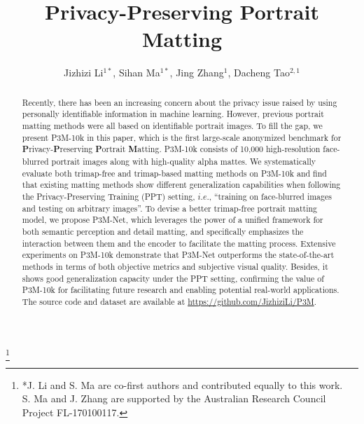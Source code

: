 \documentclass[sigconf]{acmart}
\begin{document}


\title{Privacy-Preserving Portrait Matting}

\author{Jizhizi Li$^{1*}$, Sihan Ma$^{1*}$, Jing Zhang$^{1}$, Dacheng Tao$^{2,1}$}
\thanks{*J. Li and S. Ma are co-first authors and contributed equally to this work.\\S. Ma and J. Zhang are supported by the Australian Research Council Project FL-170100117.}



\renewcommand{\shortauthors}{Li and Ma, et al.}

\setlength{\abovecaptionskip}{1pt}
\setlength{\belowcaptionskip}{1pt}
\setlength{\intextsep}{1pt}
\setlength{\textfloatsep}{2pt}

\begin{abstract}
Recently, there has been an increasing concern about the privacy issue raised by using personally identifiable information in machine learning. However, previous portrait matting methods were all based on identifiable portrait images. To fill the gap, we present P3M-10k in this paper, which is the first large-scale anonymized benchmark for \textbf{P}rivacy-\textbf{P}reserving \textbf{P}ortrait \textbf{M}atting. P3M-10k consists of 10,000 high-resolution face-blurred portrait images along with high-quality alpha mattes. We systematically evaluate both trimap-free and trimap-based matting methods on P3M-10k and find that existing matting methods show different generalization capabilities when following the Privacy-Preserving Training (PPT) setting, $i.e.$, ``training on face-blurred images and testing on arbitrary images''. To devise a better trimap-free portrait matting model, we propose P3M-Net, which leverages the power of a unified framework for both semantic perception and detail matting, and specifically emphasizes the interaction between them and the encoder to facilitate the matting process. Extensive experiments on P3M-10k demonstrate that P3M-Net outperforms the state-of-the-art methods in terms of both objective metrics and subjective visual quality. Besides, it shows good generalization capacity under the PPT setting, confirming the value of P3M-10k for facilitating future research and enabling potential real-world applications. The source code and dataset are available at \href{https://github.com/JizhiziLi/P3M}{https://github.com/JizhiziLi/P3M}.
\end{abstract}
\end{document}
